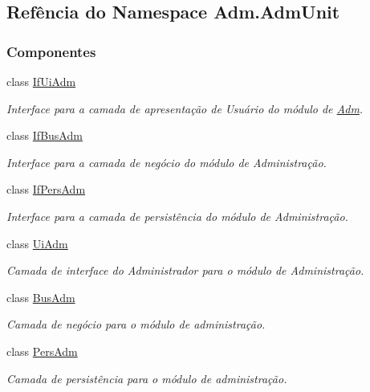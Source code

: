\hypertarget{namespaceAdm_1_1AdmUnit}{\subsection{Refência do Namespace Adm.\-Adm\-Unit}
\label{namespaceAdm_1_1AdmUnit}
}
\subsubsection*{Componentes}
\begin{DoxyCompactItemize}
\item 
class \hyperlink{classAdm_1_1AdmUnit_1_1IfUiAdm}{If\-Ui\-Adm}
\begin{DoxyCompactList}\small\item\em Interface para a camada de apresentação de Usuário do módulo de \hyperlink{namespaceAdm}{Adm}. \end{DoxyCompactList}\item 
class \hyperlink{classAdm_1_1AdmUnit_1_1IfBusAdm}{If\-Bus\-Adm}
\begin{DoxyCompactList}\small\item\em Interface para a camada de negócio do módulo de Administração. \end{DoxyCompactList}\item 
class \hyperlink{classAdm_1_1AdmUnit_1_1IfPersAdm}{If\-Pers\-Adm}
\begin{DoxyCompactList}\small\item\em Interface para a camada de persistência do módulo de Administração. \end{DoxyCompactList}\item 
class \hyperlink{classAdm_1_1AdmUnit_1_1UiAdm}{Ui\-Adm}
\begin{DoxyCompactList}\small\item\em Camada de interface do Administrador para o módulo de Administração. \end{DoxyCompactList}\item 
class \hyperlink{classAdm_1_1AdmUnit_1_1BusAdm}{Bus\-Adm}
\begin{DoxyCompactList}\small\item\em Camada de negócio para o módulo de administração. \end{DoxyCompactList}\item 
class \hyperlink{classAdm_1_1AdmUnit_1_1PersAdm}{Pers\-Adm}
\begin{DoxyCompactList}\small\item\em Camada de persistência para o módulo de administração. \end{DoxyCompactList}\end{DoxyCompactItemize}

